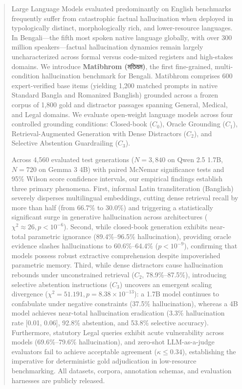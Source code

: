 \begin{abstract}
Large Language Models evaluated predominantly on English benchmarks frequently suffer from catastrophic factual hallucination when deployed in typologically distinct, morphologically rich, and lower-resource languages. In Bengali---the fifth most spoken native language globally, with over 300 million speakers---factual hallucination dynamics remain largely uncharacterized across formal versus code-mixed registers and high-stakes domains. We introduce \textbf{Matibhrom (\foreignlanguage{bengali}{মতিভ্রম})}, the first fine-grained, multi-condition hallucination benchmark for Bengali. Matibhrom comprises 600 expert-verified base items (yielding 1,200 matched prompts in native Standard Bangla and Romanized Banglish) grounded across a frozen corpus of 1,800 gold and distractor passages spanning General, Medical, and Legal domains. We evaluate open-weight language models across four controlled grounding conditions: Closed-book ($C_0$), Oracle Grounding ($C_1$), Retrieval-Augmented Generation with Dense Distractors ($C_2$), and Selective Abstention Guardrailing ($C_3$). 

Across 4,560 evaluated test generations ($N=3,840$ on Qwen 2.5 1.7B, $N=720$ on Gemma 3 4B) with paired McNemar significance tests and 95\% Wilson score confidence intervals, our empirical findings establish three primary phenomena. First, informal Latin transliteration (Banglish) severely disperses multilingual embeddings, cutting dense retrieval recall by more than half (from 66.7\% to 30.0\%) and triggering a statistically significant surge in generative hallucination across architectures ($\chi^2 \approx 26, p < 10^{-6}$). Second, while closed-book generation exhibits near-total parametric ignorance (89.4\%--96.5\% hallucination), providing oracle evidence slashes hallucinations to 60.6\%--64.4\% ($p < 10^{-9}$), confirming that models possess robust extractive comprehension despite impoverished parametric memory. Third, while dense distractors cause hallucination rebounds under unconstrained retrieval ($C_2$, 78.9\%--87.5\%), introducing selective abstention instructions ($C_3$) uncovers an emergent scaling divergence ($\chi^2 = 51.191, p = 8.38 \times 10^{-13}$): a 1.7B model continues to confabulate under negative constraints (37.5\% hallucination), whereas a 4B model achieves near-total hallucination eradication (3.3\% hallucination rate [0.01, 0.06], 92.8\% abstention, and 53.8\% selective accuracy). Furthermore, statutory Legal queries exhibit acute vulnerability across models (69.6\%--79.6\% hallucination), and zero-shot LLM-as-a-judge evaluators fail to achieve acceptable agreement ($\kappa \le 0.34$), establishing the imperative for deterministic gold adjudication in low-resource benchmarking. All datasets, corpora, annotation schemas, and evaluation harnesses are publicly released.
\end{abstract}
